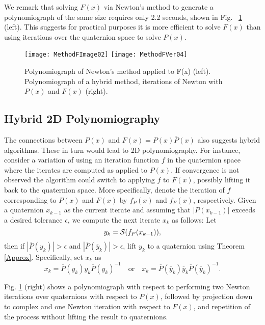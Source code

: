 \documentclass{article}
\theoremstyle{definition}
\begin{document}
We remark that solving $F(x)$ via Newton's method to generate a polynomiograph of the same size requires only 2.2 seconds, shown in Fig.~ \ref{FigF} (left).   This suggests for practical purposes it is more efficient to solve $F(x)$ than using iterations over the quaternion space to solve $P(x)$.

\begin{figure}
\begin{center}
\texttt{[image: MethodFImage02]}
\texttt{[image: MethodFVer04]}
\caption{Polynomiograph of Newton's method applied to F(x) (left).
Polynomiograph of a hybrid method, iterations of Newton with $P(x)$ and $F(x)$ (right).}
\label{FigF}
\end{center}
\end{figure}

\subsection{Hybrid 2D Polynomiography}
The connections between $P(x)$ and $F(x)=P(x)\overline P(x)$  also suggests hybrid algorithms. These in turn would lead to 2D polynomiography. For instance, consider a variation of using an iteration function $f$
in the quaternion space where the iterates are computed as applied to $P(x)$. If convergence
is not observed the algorithm could switch to applying $f$
to $F(x)$, possibly lifting it back to the quaternion space. More specifically,
denote the iteration of $f$  corresponding to $P(x)$ and
$F(x)$ by $f_P(x)$ and $f_F(x)$, respectively. Given a quaternion
$x_{k-1}$ as the current iterate and assuming that $|P(x_{k-1})|$
exceeds a desired tolerance $\epsilon$, we compute the next iterate
$x_k$ as follows: Let
\begin{equation}
y_k= {\cal S}(f_P(x_{k-1})),
\end{equation}
then if $|\overline P(y_k)| > \epsilon$ and $|\overline P(\overline y_k)| > \epsilon$, lift $y_k$ to a quaternion using Theorem \ref{Approx}.
Specifically, set $x_k$ as
\begin{equation}
x_k = \overline P(y_k) y_k  \overline P(y_k)^{-1} \quad \text{or} \quad
x_k=\overline P( \overline y_k)  \overline y_k  \overline P(
\overline y_k)^{-1}.
\end{equation}

Fig. \ref{FigF} (right) shows a polynomiograph with respect to performing two Newton iterations over quaternions with respect to $P(x)$,  followed by  projection down to complex and one Newton iteration with  respect to $F(x)$, and repetition of the process without lifting the result to quaternions.
\end{document}
